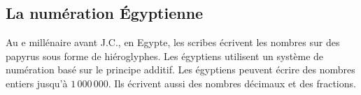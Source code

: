 \documentclass[a4paper,dvipsnames]{article}
\newcommand{\RNum}[1]{\uppercase\expandafter{\romannumeral #1\relax}}
\begin{document}
\subsection{La numération Égyptienne}

\begin{His}
Au \RNum{3}e millénaire avant J.C., en Egypte, les scribes écrivent les nombres sur des papyrus sous forme de hiéroglyphes. Les égyptiens utilisent un système de numération basé sur le principe additif. Les égyptiens peuvent écrire des nombres entiers jusqu'à $1\,000\,000$. Ils écrivent aussi des nombres décimaux et des fractions.

\newcommand{\egmil}[1]{\multido{\i=1+1}{#1}{\texttt{[image: egyptian/egypt\_person.eps]}\hspace{0.5mm}}}
\newcommand{\eghuntho}[1]{\multido{\i=1+1}{#1}{\texttt{[image: egyptian/egypt\_fish.eps]}\hspace{0.5mm}}}
\newcommand{\egtentho}[1]{\multido{\i=1+1}{#1}{\texttt{[image: egyptian/egypt\_finger.eps]}\hspace{0.5mm}}}
\newcommand{\egtho}[1]{\multido{\i=1+1}{#1}{\texttt{[image: egyptian/egypt\_lotus.eps]}\hspace{0.5mm}}}
\newcommand{\eghun}[1]{\multido{\i=1+1}{#1}{\texttt{[image: egyptian/egypt\_scroll.eps]}\hspace{0.5mm}}}
\newcommand{\egten}[1]{\multido{\i=1+1}{#1}{\texttt{[image: egyptian/egypt\_heel.eps]}\hspace{0.5mm}}}
\newcommand{\egone}[1]{\multido{\i=1+1}{#1}{\texttt{[image: egyptian/egypt\_stroke.eps]}\hspace{0.5mm}}}
\newcommand{\egyptify}[7]{
 \multido{\i=1+1}{#1}{\texttt{[image: egyptian/egypt\_person.eps]}\hspace{0.5mm}}
 \multido{\i=1+1}{#2}{\texttt{[image: egyptian/egypt\_fish.eps]}\hspace{0.5mm}}
 \multido{\i=1+1}{#3}{\texttt{[image: egyptian/egypt\_finger.eps]}\hspace{0.5mm}}
 \multido{\i=1+1}{#4}{\texttt{[image: egyptian/egypt\_lotus.eps]}\hspace{0.5mm}}
 \multido{\i=1+1}{#5}{\texttt{[image: egyptian/egypt\_scroll.eps]}\hspace{0.5mm}}
 \multido{\i=1+1}{#6}{\texttt{[image: egyptian/egypt\_heel.eps]}\hspace{0.5mm}}
 \multido{\i=1+1}{#7}{\texttt{[image: egyptian/egypt\_stroke.eps]}\hspace{0.5mm}}
 \hspace{.5mm}
}


\end{His}
\end{document}
